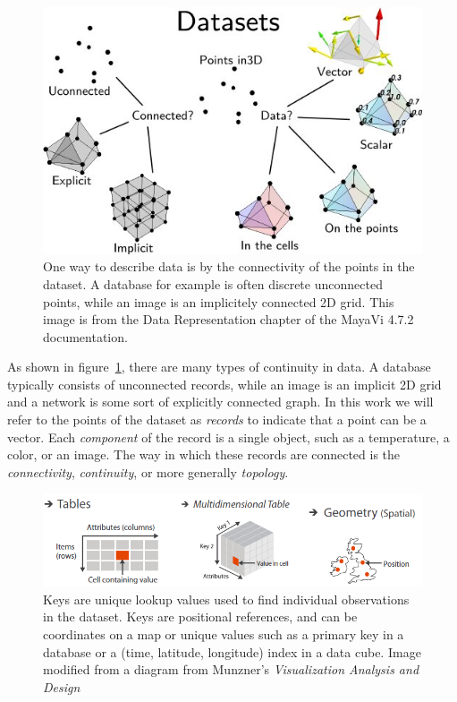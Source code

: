 \documentclass[../main.tex]{subfiles}
\begin{document}
\begin{figure}[H]
    \includegraphics[width=1\textwidth]{figures/intro/dataset_diagram.png}
    \caption{One way to describe data is by the connectivity of the points in the dataset. A database for example is often discrete unconnected points, while an image is an implicitely connected 2D grid. This image is from the Data Representation chapter of the MayaVi 4.7.2 documentation.\cite{DataRepresentationMayavi}}
    \label{fig:intro_data_format}
\end{figure}

\begin{mdframed}[roundcorner=10pt, frametitle=Notation, frametitlerule=true, frametitlebackgroundcolor=gray!10]
As shown in figure~\ref{fig:intro_data_format}, there are many types of continuity in data. A database typically consists of unconnected records, while an image is an implicit 2D grid and a network is some sort of explicitly connected graph. In this work we will refer to the points of the dataset as \textit{records} to indicate that a point can be a vector. Each \textit{component} of the record is a single object, such as a temperature, a color, or an image. The way in which these records are connected is the \textit{connectivity}, \textit{continuity}, or more generally \textit{topology}. 
\end{mdframed}

\begin{figure}[H]
    \includegraphics[width=\textwidth]{figures/intro/munzner_datatypes}
   \caption{Keys are unique lookup values used to find individual observations in the dataset. Keys are positional references, and can be coordinates on a map or unique values such as a primary key in a database or a (time, latitude, longitude) index in a data cube. Image modified from a diagram from Munzner's \textit{Visualization Analysis and Design} \cite{munznerVisualizationAnalysisDesign2014}}
   \label{fig:intro_munzner_datatypes}
   \end{figure}
\end{document}
